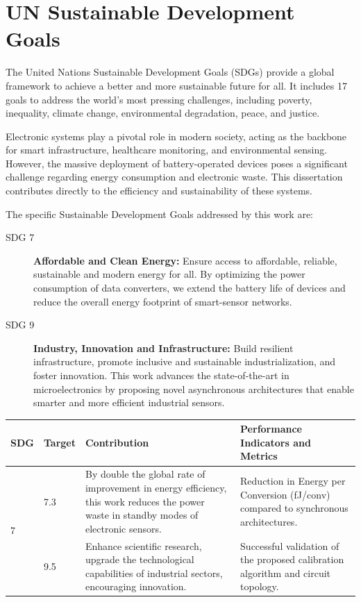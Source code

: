 
\chapter*{UN Sustainable Development Goals} \label{chap:UnitedNations}

The United Nations Sustainable Development Goals (SDGs) provide a global framework to achieve a better and more sustainable future for all. 
It includes 17 goals to address the world's most pressing challenges, including poverty, inequality, climate change, environmental degradation, peace, and justice. 

Electronic systems play a pivotal role in modern society, acting as the backbone for smart infrastructure, healthcare monitoring, and environmental sensing. However, the massive deployment of battery-operated devices poses a significant challenge regarding energy consumption and electronic waste. This dissertation contributes directly to the efficiency and sustainability of these systems.

The specific Sustainable Development Goals addressed by this work are:

\begin{description}
\item [SDG 7]
\textbf{Affordable and Clean Energy:} Ensure access to affordable, reliable, sustainable and modern energy for all. By optimizing the power consumption of data converters, we extend the battery life of devices and reduce the overall energy footprint of smart-sensor networks.
\item [SDG 9]
\textbf{Industry, Innovation and Infrastructure:} Build resilient infrastructure, promote inclusive and sustainable industrialization, and foster innovation. This work advances the state-of-the-art in microelectronics by proposing novel asynchronous architectures that enable smarter and more efficient industrial sensors.
\end{description}

\begin{center}
\begin{tabular}{|l|l|p{58mm}|p{52mm}|}
\hline
\textbf{SDG} & \textbf{Target} & \textbf{Contribution} & \textbf{Performance Indicators and Metrics} \\ 
\hline
\hline
    \multirow{3}{*}{7} & 7.3 & By double the global rate of improvement in energy efficiency, this work reduces the power waste in standby modes of electronic sensors. & Reduction in Energy per Conversion (fJ/conv) compared to synchronous architectures. \\
    \hline
    \multirow{2}{*}{9} & 9.5 & Enhance scientific research, upgrade the technological capabilities of industrial sectors, encouraging innovation. & Successful validation of the proposed calibration algorithm and circuit topology. \\
\hline
\end{tabular}
\end{center}